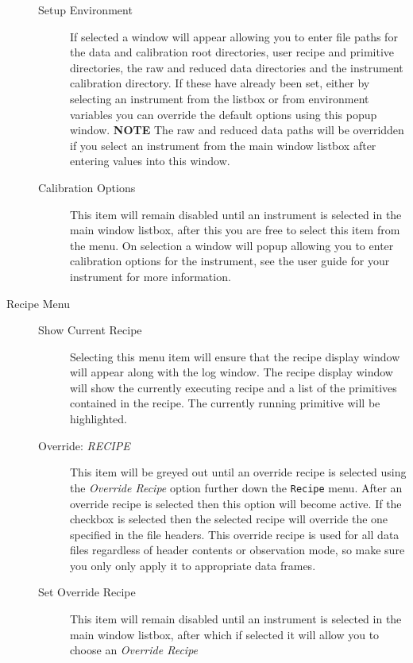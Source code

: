 \documentclass[twoside,11pt]{article}
\renewcommand{\_}{\texttt{\symbol{95}}}
\begin{document}
\begin{description}
\begin{description}
\item[Setup Environment] \mbox{}

If selected a window will appear allowing you to enter file paths for
the data and calibration root directories, user recipe and primitive
directories, the raw and reduced data directories and the instrument
calibration directory. If these have already been set, either by
selecting an instrument from the listbox or from environment variables
you can override the default options using this popup window. \textbf{NOTE}
The raw and reduced data paths will be overridden if you select an
instrument from the main window listbox after entering values into
this window.

\item[Calibration Options] \mbox{}

This item will remain disabled until an instrument is selected in the
main window listbox, after this you are free to select this item from
the menu. On selection a window will popup allowing you to enter
calibration options for the instrument, see the user guide for your
instrument for more information.

\end{description}
\item[Recipe Menu] \mbox{}\begin{description}
\item[Show Current Recipe] \mbox{}

Selecting this menu item will ensure that the recipe display window
will appear along with the log window. The recipe display window will
show the currently executing recipe and a list of the primitives
contained in the recipe. The currently running primitive will be
highlighted.

\item[Override: \textit{RECIPE}] \mbox{}

This item will be greyed out until an override recipe is selected
using the \textit{Override Recipe} option further down the \texttt{Recipe}
menu. After an override recipe is selected then this option will
become active. If the checkbox is selected then the selected recipe
will override the one specified in the file headers. This override
recipe is used for all data files regardless of header contents or
observation mode, so make sure you only only apply it to appropriate
data frames.

\item[Set Override Recipe] \mbox{}

This item will remain disabled until an instrument is selected in the
main window listbox, after which if selected it will allow you to
choose an \textit{Override Recipe}


\end{description}
\end{description}
\end{document}
